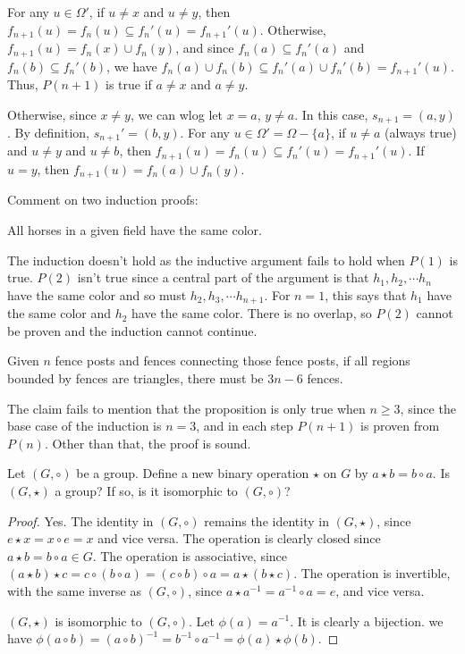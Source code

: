 \documentclass[11pt]{article}
\begin{document}
For any $u \in \Omega'$, if $u \ne x$ and $u \ne y$,
then $f_{n+1}(u) = f_n(u) \subseteq f_n'(u) = f_{n+1}'(u)$.
Otherwise, $f_{n+1}(u) = f_n(x) \cup f_n(y)$,
and since $f_n(a) \subseteq f_n'(a)$ and $f_n(b) \subseteq f_n'(b)$,
we have $f_n(a) \cup f_n(b) \subseteq f_n'(a) \cup f_n'(b) = f_{n+1}'(u)$.
Thus, $P(n+1)$ is true if $a \ne x$ and $a \ne y$.

Otherwise, since $x \ne y$, we can wlog let $x = a$, $y \ne a$.
In this case, $s_{n+1} = (a,y)$.
By definition, $s _{n+1}' = (b,y)$.
For any $u \in \Omega' = \Omega - \{a\}$, if $u \ne a$ (always true) and $u \ne y$ and $u \ne b$,
then $f_{n+1}(u) = f_n(u) \subseteq f_n'(u) = f_{n+1}'(u)$.
If $u = y$, then
$f_{n+1}(u) = f_n(a) \cup f_n(y)$.

\newpage
\begin{question}
    Comment on two induction proofs:
\end{question}

\begin{subquestion}
    All horses in a given field have the same color.
\end{subquestion}

The induction doesn't hold as the inductive argument fails to hold
when $P(1)$ is true. $P(2)$ isn't true since a central part of the
argument is that $h_{1},h_{2},\cdots h_n$ have the same color
and so must $h_{2},h_{3},\cdots h_{n+1}$. For $n=1$, this says
that $h_{1}$ have the same color and $h_{2}$ have the same color.
There is no overlap, so $P(2)$ cannot be proven and
the induction cannot continue.

\begin{subquestion}
    Given $n$ fence posts and fences connecting those fence posts,
    if all regions bounded by fences are triangles, there must be $3n-6$ fences.
\end{subquestion}

The claim fails to mention that the proposition is
only true when $n \ge 3$, since the base case of the
induction is $n = 3$, and in each step $P(n+1)$ is proven from $P(n)$.
Other than that, the proof is sound.

\newpage
\begin{question}
    Let $(G,\circ)$ be a group.
    Define a new binary operation $\star$ on $G$ by $a \star b = b \circ a$.
    Is $(G,\star)$ a group? If so, is it isomorphic to $(G,\circ)$?
\end{question}

\begin{proof}
    Yes. The identity in $(G,\circ)$ remains the identity in $(G,\star)$,
    since $e \star x = x \circ e = x$ and vice versa.
    The operation is clearly closed since $a \star b = b \circ a \in G$.
    The operation is associative, since
    $(a \star b) \star c = c \circ (b \circ a) = (c \circ b) \circ a = a \star (b \star c)$.
    The operation is invertible, with the same inverse as $(G,\circ)$,
    since $a \star a^{-1} = a^{-1} \circ a = e$, and vice versa.

    $(G,\star)$ is isomorphic to $(G,\circ)$. Let $\phi(a) = a^{-1}$. 
    It is clearly a bijection. we have
    $\phi(a \circ b) = (a \circ b)^{-1} = b^{-1} \circ a^{-1} = \phi(a) \star \phi(b)$.
\end{proof}
\end{document}
